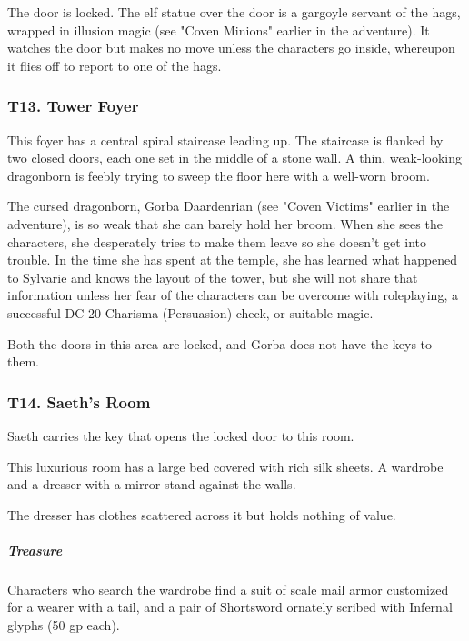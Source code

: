 \documentclass[10pt,a4paper,twoside,bg=print,twocolumn,openany,nodeprecatedcode]{dndbook}
\begin{document}
The door is locked. The elf statue over the door is a gargoyle servant of the hags, wrapped in illusion magic (see "Coven Minions" earlier in the adventure). It watches the door but makes no move unless the characters go inside, whereupon it flies off to report to one of the hags.

\subsubsection{T13. Tower Foyer}
\begin{DndReadAloud}{}
This foyer has a central spiral staircase leading up. The staircase is flanked by two closed doors, each one set in the middle of a stone wall. A thin, weak-looking dragonborn is feebly trying to sweep the floor here with a well-worn broom.

\end{DndReadAloud}

The cursed dragonborn, Gorba Daardenrian (see "Coven Victims" earlier in the adventure), is so weak that she can barely hold her broom. When she sees the characters, she desperately tries to make them leave so she doesn't get into trouble. In the time she has spent at the temple, she has learned what happened to Sylvarie and knows the layout of the tower, but she will not share that information unless her fear of the characters can be overcome with roleplaying, a successful DC 20 Charisma (Persuasion) check, or suitable magic.

Both the doors in this area are locked, and Gorba does not have the keys to them.

\subsubsection{T14. Saeth's Room}
Saeth carries the key that opens the locked door to this room.

\begin{DndReadAloud}{}
This luxurious room has a large bed covered with rich silk sheets. A wardrobe and a dresser with a mirror stand against the walls.

\end{DndReadAloud}

The dresser has clothes scattered across it but holds nothing of value.

\subparagraph{Treasure}
Characters who search the wardrobe find a suit of scale mail armor customized for a wearer with a tail, and a pair of Shortsword ornately scribed with Infernal glyphs (50 gp each).
\end{document}
